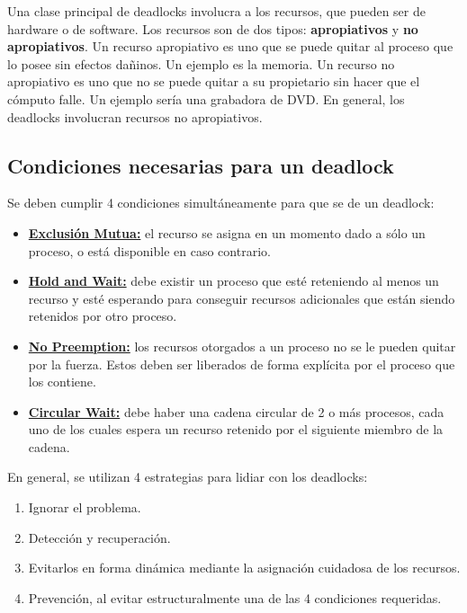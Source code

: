 Una clase principal de deadlocks involucra a los recursos, que pueden ser de hardware o de software. Los recursos son de dos tipos: \textbf{apropiativos} y \textbf{no apropiativos}. Un recurso apropiativo es uno que se puede quitar al proceso que lo posee sin efectos dañinos. Un ejemplo es la memoria. Un recurso no apropiativo es uno que no se puede quitar a su propietario sin hacer que el cómputo falle. Un ejemplo sería una grabadora de DVD. En general, los deadlocks involucran recursos no apropiativos.

\subsection{Condiciones necesarias para un deadlock}

Se deben cumplir 4 condiciones simultáneamente para que se de un deadlock:

\begin{itemize}
\item  \textbf{\underline{Exclusión Mutua:}} el recurso se asigna en un momento dado a sólo un proceso, o está disponible en caso contrario.
\item  \textbf{\underline{Hold and Wait:}} debe existir un proceso que esté reteniendo al menos un recurso y esté esperando para conseguir recursos adicionales que están siendo retenidos por otro proceso.
\item  \textbf{\underline{No Preemption:}} los recursos otorgados a un proceso no se le pueden quitar por la fuerza. Estos deben ser liberados de forma explícita por el proceso que los contiene.
\item  \textbf{\underline{Circular Wait:}} debe haber una cadena circular de 2 o más procesos, cada uno de los cuales espera un recurso retenido por el siguiente miembro de la cadena.
\end{itemize}

En general, se utilizan 4 estrategias para lidiar con los deadlocks:

\begin{enumerate}[1]
\item Ignorar el problema.
\item Detección y recuperación.
\item Evitarlos en forma dinámica mediante la asignación cuidadosa de los recursos.
\item Prevención, al evitar estructuralmente una de las 4 condiciones requeridas.
\end{enumerate}

